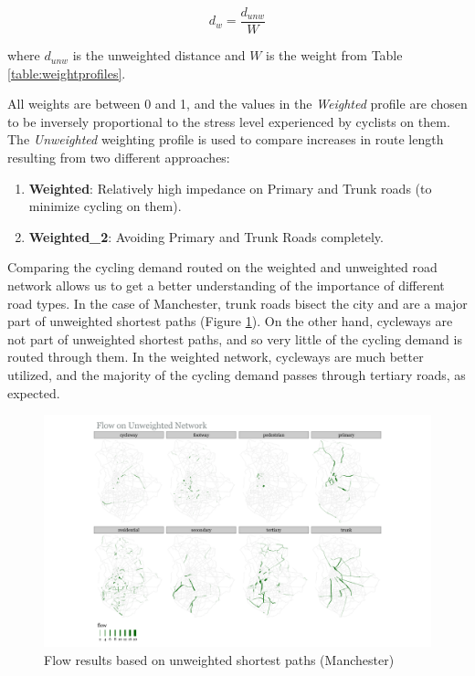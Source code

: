 \documentclass[
]{article}
\providecommand{\tightlist}{%
  \setlength{\itemsep}{0pt}\setlength{\parskip}{0pt}}
\begin{document}
\begin{equation}\label{eq:weight_distance}
    d_{w} = \frac{d_{unw}}{W}
\end{equation}

\noindent where \(d_{unw}\) is the unweighted distance and
\(W\) is the weight from Table \ref{table:weightprofiles}.

All weights are between 0 and 1, and the values in the
\textit{Weighted} profile are chosen to be inversely proportional to
the stress level experienced by cyclists on them. The
\textit{Unweighted} weighting profile is used to compare increases in
route length resulting from two different approaches:

\begin{enumerate}
\def\labelenumi{\arabic{enumi}.}
\tightlist
\item
  \textbf{Weighted}: Relatively high impedance on Primary and Trunk roads
  (to minimize cycling on them).
\item
  \textbf{Weighted\_2}: Avoiding Primary and Trunk Roads completely.
\end{enumerate}

Comparing the cycling demand routed on the weighted and unweighted road
network allows us to get a better understanding of the importance of
different road types. In the case of Manchester, trunk roads bisect the
city and are a major part of unweighted shortest paths (Figure
\ref{fig:flowsfacetunweighted}). On the other hand, cycleways are not
part of unweighted shortest paths, and so very little of the cycling
demand is routed through them. In the weighted network, cycleways are
much better utilized, and the majority of the cycling demand passes
through tertiary roads, as expected.

\begin{figure}
\includegraphics[width=0.9\linewidth]{data/Manchester/Plots/flows_facet_unweighted_Manchester} \caption{Flow results based on unweighted shortest paths (Manchester)}\label{fig:flowsfacetunweighted}
\end{figure}
\end{document}
